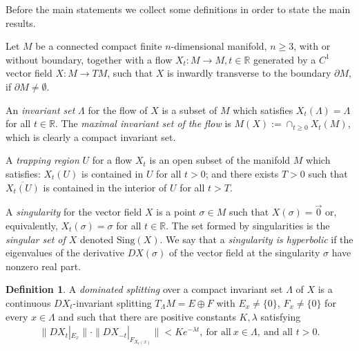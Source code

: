 \documentclass[12pt,reqno]{amsart}
\numberwithin{equation}{section}
\theoremstyle{plain}
\theoremstyle{definition}
\newtheorem{definition}{Definition}
\newcommand{\RR}{{\mathbb R}}
\newcommand{\la}{\lambda}
\newcommand{\sing}{\mathrm{Sing}}
\newcommand{\R}{\EuScript{R}}
\begin{document}
Before the main statements we collect some definitions in
order to state the main results.

Let $M$ be a connected compact finite $n$-dimensional
manifold, $n \geq 3$, with or without boundary, together
with a flow $X_t : M \to M, t \in \mathbb{R}$ generated by a
$C^1$ vector field $X: M \to TM$, such that $X$ is inwardly
transverse to the boundary $\partial M$, if $\partial
M\neq\emptyset$.

An \emph{invariant set} $\Lambda$ for the flow of $X$ is a
subset of $M$ which satisfies $X_t(\Lambda)=\Lambda$ for all
$t\in\RR$.  The \emph{maximal invariant set of the flow} is
$M(X):= \cap_{t \geq 0} X_t(M)$, which is clearly a compact
invariant set.

A \emph{trapping region} $U$ for a flow $X_t$ is an
open subset of the manifold $M$ which satisfies: $X_t(U)$ is
contained in $U$ for all $t>0$; and there exists $T>0$ such
that $\overline{X_t(U)} $ is contained in the interior of
$U$ for all $t>T$.

A \emph{singularity} for the vector field $X$
is a point $\sigma\in M$ such that $X(\sigma)=\vec0$ or,
equivalently, $X_t(\sigma)=\sigma$ for all $t \in \RR$. The
set formed by singularities is the \emph{singular set of
  $X$} denoted $\sing(X)$.  We say that a \emph{singularity is
  hyperbolic} if the eigenvalues of the derivative
$DX(\sigma)$ of the vector field at the singularity $\sigma$
have nonzero real part.
\begin{definition}\label{def1}
  A \emph{dominated splitting} over a compact invariant set $\Lambda$ of $X$
  is a continuous $DX_t$-invariant splitting $T_{\Lambda}M =
  E \oplus F$ with $E_x \neq \{0\}$, $F_x \neq \{0\}$ for
  every $x \in \Lambda$ and such that there are positive
  constants $K, \lambda$ satisfying
  \begin{align}\label{eq:def-dom-split}
    \|DX_t|_{E_x}\|\cdot\|DX_{-t}|_{F_{X_t(x)}}\|<Ke^{-\la
      t}, \ \textrm{for all} \ x \in \Lambda, \ \textrm{and
      all} \,\,t> 0.
  \end{align}
\end{definition}
\end{document}
